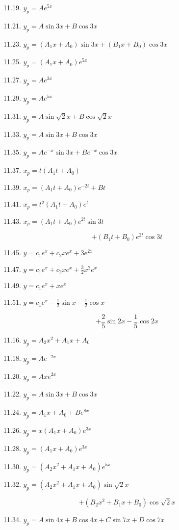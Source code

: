 \documentclass[10pt]{article}
\begin{document}
11.19. $y_{p}=A e^{5 x}$

11.21. $y_{p}=A \sin 3 x+B \cos 3 x$

11.23. $y_{p}=\left(A_{1} x+A_{0}\right) \sin 3 x+\left(B_{1} x+B_{0}\right) \cos 3 x$

11.25. $y_{p}=\left(A_{1} x+A_{0}\right) e^{5 x}$

11.27. $y_{p}=A e^{3 x}$

11.29. $y_{p}=A e^{5 x}$

11.31. $y_{p}=A \sin \sqrt{2} x+B \cos \sqrt{2} x$

11.33. $y_{p}=A \sin 3 x+B \cos 3 x$

11.35. $y_{p}=A e^{-x} \sin 3 x+B e^{-x} \cos 3 x$

11.37. $x_{p}=t\left(A_{1} t+A_{0}\right)$

11.39. $x_{p}=\left(A_{1} t+A_{0}\right) e^{-2 t}+B t$

11.41. $x_{p}=t^{2}\left(A_{1} t+A_{0}\right) e^{t}$

11.43. $x_{p}=\left(A_{1} t+A_{0}\right) e^{2 t} \sin 3 t$

$$
+\left(B_{1} t+B_{0}\right) e^{2 t} \cos 3 t
$$

11.45. $y=c_{1} e^{x}+c_{2} x e^{x}+3 e^{2 x}$

11.47. $y=c_{1} e^{x}+c_{2} x e^{x}+\frac{3}{2} x^{2} e^{x}$

11.49. $y=c_{1} e^{x}+x e^{x}$

11.51. $y=c_{1} e^{x}-\frac{1}{2} \sin x-\frac{1}{2} \cos x$

$$
+\frac{2}{5} \sin 2 x-\frac{1}{5} \cos 2 x
$$

11.16. $y_{p}=A_{2} x^{2}+A_{1} x+A_{0}$

11.18. $y_{p}=A e^{-2 x}$

11.20. $y_{p}=A x e^{2 x}$

11.22. $y_{p}=A \sin 3 x+B \cos 3 x$

11.24. $y_{p}=A_{1} x+A_{0}+B e^{8 x}$

11.26. $y_{p}=x\left(A_{1} x+A_{0}\right) e^{3 x}$

11.28. $y_{p}=\left(A_{1} x+A_{0}\right) e^{3 x}$

11.30. $y_{p}=\left(A_{2} x^{2}+A_{1} x+A_{0}\right) e^{5 x}$

11.32. $y_{p}=\left(A_{2} x^{2}+A_{1} x+A_{0}\right) \sin \sqrt{2} x$

$$
+\left(B_{2} x^{2}+B_{1} x+B_{0}\right) \cos \sqrt{2} x
$$

11.34. $y_{p}=A \sin 4 x+B \cos 4 x+C \sin 7 x+D \cos 7 x$
\end{document}
